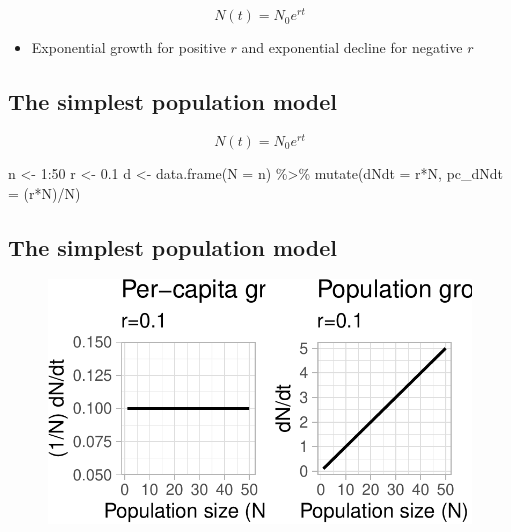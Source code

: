 \documentclass[
  letterpaper,
  DIV=11,
  numbers=noendperiod]{scrartcl}
\newenvironment{Shaded}{\begin{snugshade}}{\end{snugshade}}
\newcommand{\AttributeTok}[1]{\textcolor[rgb]{0.40,0.45,0.13}{#1}}
\newcommand{\DecValTok}[1]{\textcolor[rgb]{0.68,0.00,0.00}{#1}}
\newcommand{\FloatTok}[1]{\textcolor[rgb]{0.68,0.00,0.00}{#1}}
\newcommand{\FunctionTok}[1]{\textcolor[rgb]{0.28,0.35,0.67}{#1}}
\newcommand{\NormalTok}[1]{\textcolor[rgb]{0.00,0.23,0.31}{#1}}
\newcommand{\OtherTok}[1]{\textcolor[rgb]{0.00,0.23,0.31}{#1}}
\newcommand{\SpecialCharTok}[1]{\textcolor[rgb]{0.37,0.37,0.37}{#1}}
\providecommand{\tightlist}{%
  \setlength{\itemsep}{0pt}\setlength{\parskip}{0pt}}\usepackage{longtable,booktabs,array}
\begin{document}
\[N(t)=N_0e^{rt}\]

\begin{itemize}
\tightlist
\item
  Exponential growth for positive \(r\) and exponential decline for
  negative \(r\)
\end{itemize}

\hypertarget{the-simplest-population-model-3}{%
\subsection{The simplest population
model}\label{the-simplest-population-model-3}}

\[N(t)=N_0e^{rt}\]

\begin{Shaded}
\begin{Highlighting}[]
\NormalTok{n }\OtherTok{\textless{}{-}} \DecValTok{1}\SpecialCharTok{:}\DecValTok{50}
\NormalTok{r }\OtherTok{\textless{}{-}} \FloatTok{0.1}
\NormalTok{d }\OtherTok{\textless{}{-}} \FunctionTok{data.frame}\NormalTok{(}\AttributeTok{N =}\NormalTok{ n) }\SpecialCharTok{\%\textgreater{}\%} 
  \FunctionTok{mutate}\NormalTok{(}\AttributeTok{dNdt =}\NormalTok{ r}\SpecialCharTok{*}\NormalTok{N,}
         \AttributeTok{pc\_dNdt =}\NormalTok{ (r}\SpecialCharTok{*}\NormalTok{N)}\SpecialCharTok{/}\NormalTok{N)}
\end{Highlighting}
\end{Shaded}

\hypertarget{the-simplest-population-model-4}{%
\subsection{The simplest population
model}\label{the-simplest-population-model-4}}

\begin{figure}

{\centering \includegraphics{ecological_interactions_files/figure-pdf/unnamed-chunk-3-1.pdf}

}

\end{figure}
\end{document}
